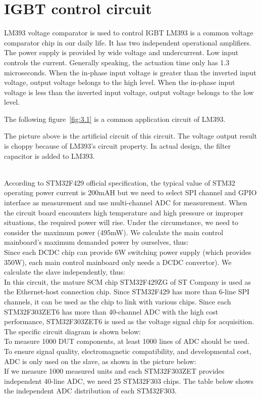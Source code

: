 \section{IGBT control circuit}
\label{sec:IGBT control circuit}
LM393 voltage comparator is used to control IGBT 
LM393 is a common voltage comparator chip in our daily life. It has two independent operational amplifiers. The power supply is provided by wide voltage and undercurrent. Low input controls the current. Generally speaking, the actuation time only has 1.3 microseconds. When the in-phase input voltage is greater than the inverted input voltage, output voltage belongs to the high level. When the in-phase input voltage is less than the inverted input voltage, output voltage belongs to the low level. 

The following figure~\ref{fig:3.1} is a common application circuit of LM393.








The picture above is the artificial circuit of this circuit. The voltage output result is choppy because of LM393’s circuit property. In actual design, the filter capacitor is added to LM393. 

\\
According to STM32F429 official specification, the typical value of STM32 operating power current is 200mAH but we need to select SPI channel and GPIO interface as measurement and use multi-channel ADC for measurement. When the circuit board encounters high temperature and high pressure or improper situations, the required power will rise. Under the circumstance, we need to consider the maximum power (495mW). 
We calculate the main control mainboard’s maximum demanded power by ourselves, thus: 
\\
Since each DCDC chip can provide 6W switching power supply (which provides 350W), each main control mainboard only needs a DCDC convertor). 
We calculate the slave independently, thus: 
\\
In this circuit, the mature SCM chip STM32F429ZG of ST Company is used as the Ethernet-host connection chip. Since STM32F429 has more than 6-line SPI channels, it can be used as the chip to link with various chips. Since each STM32F303ZET6 has more than 40-channel ADC with the high cost performance, STM32F303ZET6 is used as the voltage signal chip for acquisition. 
The specific circuit diagram is shown below: 
\\
To measure 1000 DUT components, at least 1000 lines of ADC should be used. To ensure signal quality, electromagnetic compatibility, and developmental cost, ADC is only used on the slave, as shown in the picture below: 
\\
If we measure 1000 measured units and each STM32F303ZET provides independent 40-line ADC, we need 25 STM32F303 chips. The table below shows the independent ADC distribution of each STM32F303. 
\\

